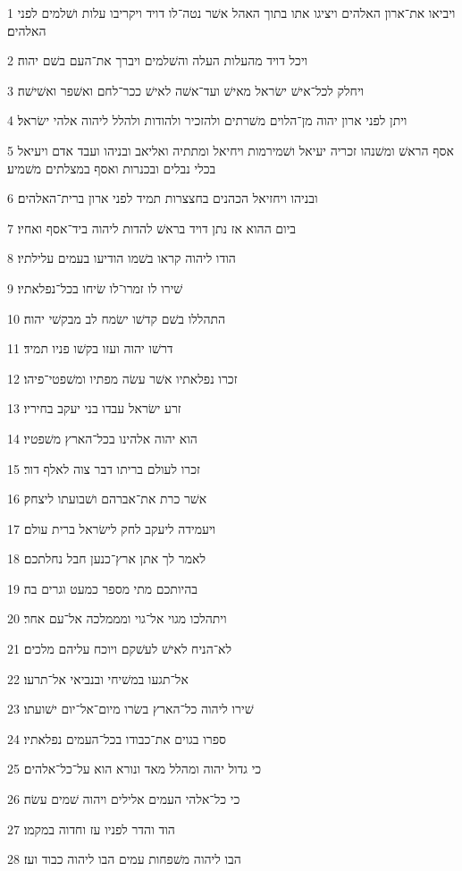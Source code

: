 \par 1 ויביאו את־ארון האלהים ויציגו אתו בתוך האהל אשׁר נטה־לו דויד ויקריבו עלות ושׁלמים לפני האלהים׃
\par 2 ויכל דויד מהעלות העלה והשׁלמים ויברך את־העם בשׁם יהוה׃
\par 3 ויחלק לכל־אישׁ ישׂראל מאישׁ ועד־אשׁה לאישׁ ככר־לחם ואשׁפר ואשׁישׁה׃
\par 4 ויתן לפני ארון יהוה מן־הלוים משׁרתים ולהזכיר ולהודות ולהלל ליהוה אלהי ישׂראל׃
\par 5 אסף הראשׁ ומשׁנהו זכריה יעיאל ושׁמירמות ויחיאל ומתתיה ואליאב ובניהו ועבד אדם ויעיאל בכלי נבלים ובכנרות ואסף במצלתים משׁמיע׃
\par 6 ובניהו ויחזיאל הכהנים בחצצרות תמיד לפני ארון ברית־האלהים׃
\par 7 ביום ההוא אז נתן דויד בראשׁ להדות ליהוה ביד־אסף ואחיו׃
\par 8 הודו ליהוה קראו בשׁמו הודיעו בעמים עלילתיו׃
\par 9 שׁירו לו זמרו־לו שׂיחו בכל־נפלאתיו׃
\par 10 התהללו בשׁם קדשׁו ישׂמח לב מבקשׁי יהוה׃
\par 11 דרשׁו יהוה ועזו בקשׁו פניו תמיד׃
\par 12 זכרו נפלאתיו אשׁר עשׂה מפתיו ומשׁפטי־פיהו׃
\par 13 זרע ישׂראל עבדו בני יעקב בחיריו׃
\par 14 הוא יהוה אלהינו בכל־הארץ משׁפטיו׃
\par 15 זכרו לעולם בריתו דבר צוה לאלף דור׃
\par 16 אשׁר כרת את־אברהם ושׁבועתו ליצחק׃
\par 17 ויעמידה ליעקב לחק לישׂראל ברית עולם׃
\par 18 לאמר לך אתן ארץ־כנען חבל נחלתכם׃
\par 19 בהיותכם מתי מספר כמעט וגרים בה׃
\par 20 ויתהלכו מגוי אל־גוי ומממלכה אל־עם אחר׃
\par 21 לא־הניח לאישׁ לעשׁקם ויוכח עליהם מלכים׃
\par 22 אל־תגעו במשׁיחי ובנביאי אל־תרעו׃
\par 23 שׁירו ליהוה כל־הארץ בשׂרו מיום־אל־יום ישׁועתו׃
\par 24 ספרו בגוים את־כבודו בכל־העמים נפלאתיו׃
\par 25 כי גדול יהוה ומהלל מאד ונורא הוא על־כל־אלהים׃
\par 26 כי כל־אלהי העמים אלילים ויהוה שׁמים עשׂה׃
\par 27 הוד והדר לפניו עז וחדוה במקמו׃
\par 28 הבו ליהוה משׁפחות עמים הבו ליהוה כבוד ועז׃
